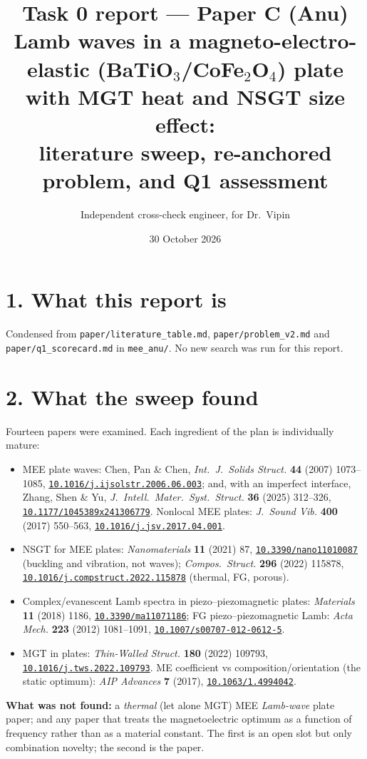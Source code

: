 \documentclass[11pt]{article}
\title{\vspace{-1.2cm}\textbf{Task 0 report --- Paper C (Anu)}\\[2pt]
\large Lamb waves in a magneto-electro-elastic (BaTiO$_3$/CoFe$_2$O$_4$) plate with MGT heat and
NSGT size effect:\\literature sweep, re-anchored problem, and Q1 assessment}
\author{Independent cross-check engineer, for Dr.\ Vipin}
\date{30 October 2026}
\newcommand{\doi}[1]{\href{https://doi.org/#1}{\texttt{#1}}}
\begin{document}
\maketitle
\vspace{-0.5cm}

\section*{1. What this report is}
Condensed from \texttt{paper/literature\_table.md}, \texttt{paper/problem\_v2.md} and
\texttt{paper/q1\_scorecard.md} in \texttt{mee\_anu/}. No new search was run for this report.

\section*{2. What the sweep found}
Fourteen papers were examined. Each ingredient of the plan is individually mature:

\begin{itemize}\small
\item MEE plate waves: Chen, Pan \& Chen, \emph{Int.\ J.\ Solids Struct.} \textbf{44} (2007)
  1073--1085, \doi{10.1016/j.ijsolstr.2006.06.003}; and, with an imperfect interface, Zhang, Shen \&
  Yu, \emph{J.\ Intell.\ Mater.\ Syst.\ Struct.} \textbf{36} (2025) 312--326,
  \doi{10.1177/1045389x241306779}. Nonlocal MEE plates: \emph{J.\ Sound Vib.} \textbf{400} (2017)
  550--563, \doi{10.1016/j.jsv.2017.04.001}.
\item NSGT for MEE plates: \emph{Nanomaterials} \textbf{11} (2021) 87, \doi{10.3390/nano11010087}
  (buckling and vibration, not waves); \emph{Compos.\ Struct.} \textbf{296} (2022) 115878,
  \doi{10.1016/j.compstruct.2022.115878} (thermal, FG, porous).
\item Complex/evanescent Lamb spectra in piezo--piezomagnetic plates: \emph{Materials} \textbf{11}
  (2018) 1186, \doi{10.3390/ma11071186}; FG piezo--piezomagnetic Lamb:
  \emph{Acta Mech.} \textbf{223} (2012) 1081--1091, \doi{10.1007/s00707-012-0612-5}.
\item MGT in plates: \emph{Thin-Walled Struct.} \textbf{180} (2022) 109793,
  \doi{10.1016/j.tws.2022.109793}. ME coefficient vs composition/orientation (the static optimum):
  \emph{AIP Advances} \textbf{7} (2017), \doi{10.1063/1.4994042}.
\end{itemize}

\noindent \textbf{What was not found:} a \emph{thermal} (let alone MGT) MEE \emph{Lamb-wave} plate
paper; and any paper that treats the magnetoelectric optimum as a function of frequency rather than
as a material constant. The first is an open slot but only combination novelty; the second is the
paper.
\end{document}

